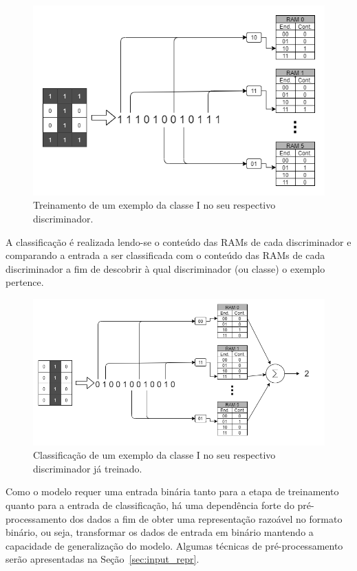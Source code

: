     \begin{figure}[!ht] \label{fig:wsd_train}
    \centering
    \includegraphics[width=5.0in]{img/wisard_training.png}
    \caption{Treinamento de um exemplo da classe I no seu respectivo discriminador.}
    \end{figure}
    
    A classificação é realizada lendo-se o conteúdo das RAMs de cada discriminador e comparando a entrada a ser classificada com o conteúdo das RAMs de cada discriminador a fim de descobrir à qual discriminador (ou classe) o exemplo pertence.
    
    \begin{figure}[!ht] \label{fig:wsd_classification}
    \centering
    \includegraphics[width=5.0in]{img/wisard_classification.png}
    \caption{Classificação de um exemplo da classe I no seu respectivo discriminador já treinado.}
    \end{figure}
    
    Como o modelo requer uma entrada binária tanto para a etapa de treinamento quanto para a entrada de classificação, há uma dependência forte do pré-processamento dos dados a fim de obter uma representação razoável no formato binário, ou seja, transformar os dados de entrada em binário mantendo a capacidade de generalização do modelo. Algumas técnicas de pré-processamento serão apresentadas na Seção~\ref{sec:input_repr}.
    
